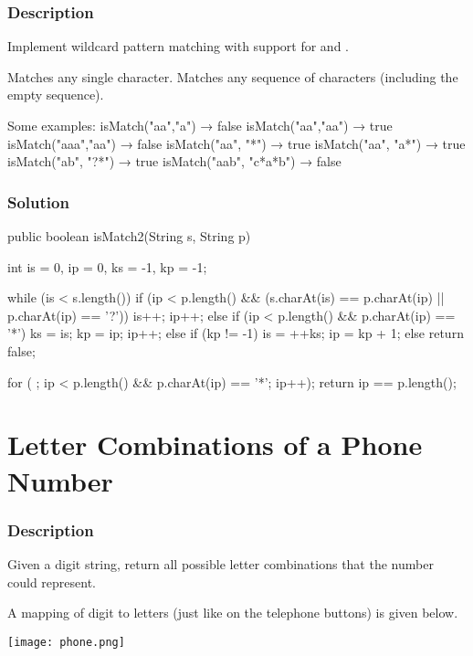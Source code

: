 \subsubsection{Description}
Implement wildcard pattern matching with support for  and .

 Matches any single character.
 Matches any sequence of characters (including the empty sequence).

\begin{Code}
Some examples:
isMatch("aa","a") → false
isMatch("aa","aa") → true
isMatch("aaa","aa") → false
isMatch("aa", "*") → true
isMatch("aa", "a*") → true
isMatch("ab", "?*") → true
isMatch("aab", "c*a*b") → false
\end{Code}

\subsubsection{Solution}
\begin{Code}
public boolean isMatch2(String s, String p) {
    int is = 0, ip = 0, ks = -1, kp = -1;

    while (is < s.length()) {
        if (ip < p.length() && (s.charAt(is) == p.charAt(ip) || p.charAt(ip) == '?')) {
            is++;
            ip++;
        } else if (ip < p.length() && p.charAt(ip) == '*') {
            ks = is;
            kp = ip;
            ip++;
        } else if (kp != -1) {
            is = ++ks;
            ip = kp + 1;
        } else {
            return false;
        }
    }

    for ( ; ip < p.length() && p.charAt(ip) == '*'; ip++);
    return ip == p.length();
}
\end{Code}

\newpage

\section{Letter Combinations of a Phone Number} %

\subsubsection{Description}
Given a digit string, return all possible letter combinations that the number could represent.

A mapping of digit to letters (just like on the telephone buttons) is given below.

\begin{center}
\texttt{[image: phone.png]}\\
\label{fig:phone-keyboard}
\end{center}

